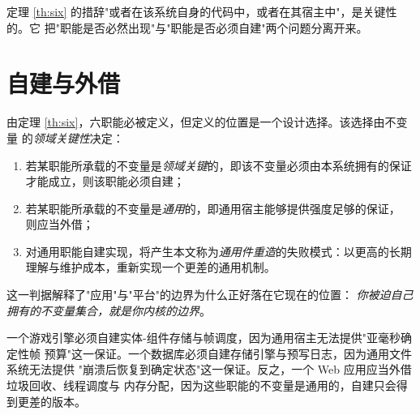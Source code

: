 定理 \ref{th:six} 的措辞"或者在该系统自身的代码中，或者在其宿主中"，是关键性的。它
把"职能是否必然出现"与"职能是否必须自建"两个问题分离开来。

\section{自建与外借}\label{sec:buildadopt}

\begin{corollary}[自建/外借二分]\label{cor:buildadopt}
由定理 \ref{th:six}，六职能必被定义，但定义的位置是一个设计选择。该选择由不变量
的\emph{领域关键性}决定：
\begin{enumerate}[label=(\alph*)]
\item 若某职能所承载的不变量是\emph{领域关键}的，即该不变量必须由本系统拥有的保证
      才能成立，则该职能必须自建；
\item 若某职能所承载的不变量是\emph{通用}的，即通用宿主能够提供强度足够的保证，
      则应当外借；
\item 对通用职能自建实现，将产生本文称为\emph{通用件重造}的失败模式：以更高的长期
      理解与维护成本，重新实现一个更差的通用机制。
\end{enumerate}
\end{corollary}

这一判据解释了"应用"与"平台"的边界为什么正好落在它现在的位置：
\emph{你被迫自己拥有的不变量集合，就是你内核的边界}。

\begin{example}\label{ex:buildadopt}
一个游戏引擎必须自建实体-组件存储与帧调度，因为通用宿主无法提供"亚毫秒确定性帧
预算"这一保证。一个数据库必须自建存储引擎与预写日志，因为通用文件系统无法提供
"崩溃后恢复到确定状态"这一保证。反之，一个 Web 应用应当外借垃圾回收、线程调度与
内存分配，因为这些职能的不变量是通用的，自建只会得到更差的版本。
\end{example}

